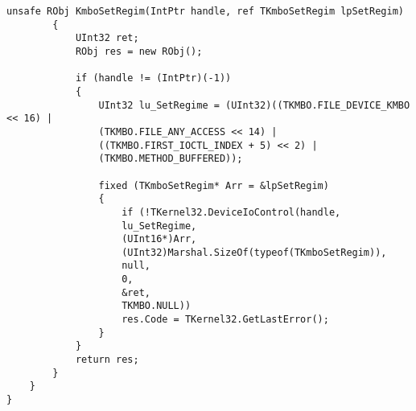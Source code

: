\begin{lstlisting}[label=pci,caption=Основные функции взаимодействия с PCI]
		unsafe RObj KmboSetRegim(IntPtr handle, ref TKmboSetRegim lpSetRegim)
		{
			UInt32 ret;
			RObj res = new RObj();
			
			if (handle != (IntPtr)(-1))
			{
				UInt32 lu_SetRegime = (UInt32)((TKMBO.FILE_DEVICE_KMBO << 16) | 
				(TKMBO.FILE_ANY_ACCESS << 14) |
				((TKMBO.FIRST_IOCTL_INDEX + 5) << 2) | 
				(TKMBO.METHOD_BUFFERED));
				
				fixed (TKmboSetRegim* Arr = &lpSetRegim)
				{
					if (!TKernel32.DeviceIoControl(handle,
					lu_SetRegime,
					(UInt16*)Arr,
					(UInt32)Marshal.SizeOf(typeof(TKmboSetRegim)),
					null,
					0,
					&ret,
					TKMBO.NULL))
					res.Code = TKernel32.GetLastError();
				}
			}
			return res;
		}
	}
}
\end{lstlisting}